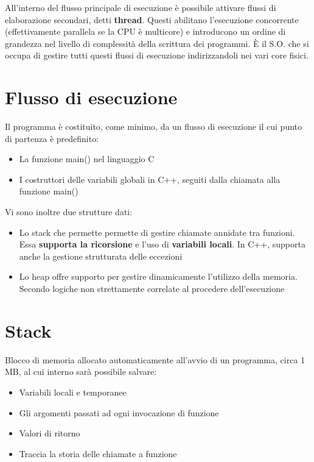 All'interno del flusso principale di esecuzione è possibile attivare flussi di elaborazione secondari, detti \textbf{thread}. Questi abilitano l'esecuzione concorrente (effettivamente parallela se la CPU è multicore) e introducono un ordine di grandezza nel livello di complessità della scrittura dei programmi. È il S.O. che si occupa di gestire tutti questi flussi di esecuzione indirizzandoli nei vari core fisici.

\section{Flusso di esecuzione }

Il programma è costituito, come minimo, da un flusso di esecuzione il cui punto di partenza è predefinito:
\begin{itemize}
  \item La funzione main() nel linguaggio C
  \item I costruttori delle variabili globali in C++, seguiti dalla chiamata alla funzione main()
\end{itemize}

Vi sono inoltre due strutture dati:

\begin{itemize}
  \item Lo stack che permette permette di gestire chiamate annidate tra funzioni. Essa \textbf{supporta la ricorsione} e l'uso di \textbf{variabili locali}. In C++, supporta anche la gestione strutturata delle eccezioni
  \item Lo heap offre supporto per gestire dinamicamente l'utilizzo della memoria. Secondo logiche non strettamente correlate al procedere dell'esecuzione
\end{itemize}

\section{Stack}

Blocco di memoria allocato automaticamente all'avvio di un programma, circa 1 MB, al cui interno sarà possibile salvare:


\begin{itemize}
  \item Variabili locali e temporanee
  \item Gli argomenti passati ad ogni invocazione di funzione
  \item Valori di ritorno
  \item Traccia la storia delle chiamate a funzione
\end{itemize}

